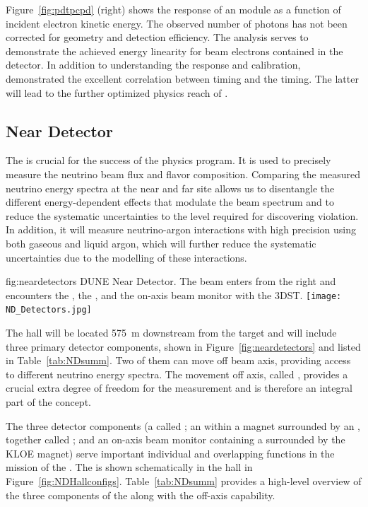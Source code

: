 Figure~\ref{fig:pdtpcpd} (right) shows the response of an %
  module as a function of incident electron kinetic energy.
The observed number of photons has not been corrected for geometry and detection efficiency. The analysis serves to demonstrate the achieved energy linearity for beam electrons contained in the detector.  
In addition to understanding the  response and calibration,  demonstrated the excellent correlation between  timing and the  timing. The latter will lead to the further optimized physics reach of . 


\subsection{Near Detector}
\label{sec:nd-verview}

The   is crucial for the success of the  physics program. It is used to precisely measure the neutrino beam flux and flavor composition. Comparing the measured neutrino energy spectra at the near and far site allows us to disentangle the different energy-dependent effects that modulate the beam spectrum and to reduce the systematic uncertainties to the level required for discovering  violation. In addition, it will measure neutrino-argon interactions with high precision using both gaseous and liquid argon, which will further reduce the systematic uncertainties due to the modelling of these interactions.

\begin{dunefigure}
{fig:neardetectors}
{DUNE Near Detector. The beam enters from the right and encounters
the , the , and the on-axis beam monitor with the 3DST.}
\texttt{[image: ND\_Detectors.jpg]}
\end{dunefigure}


The  hall will be located \SI{575}{m} downstream from the target and will include three primary detector components, shown in Figure~\ref{fig:neardetectors}  and listed in Table~\ref{tab:NDsumm}. Two of them can move off beam axis, providing access to different neutrino energy spectra. The movement off axis, called , provides a crucial extra degree of freedom for the  measurement and is therefore an integral part of the   concept. 

The three detector components (a  called ; an  within a magnet surrounded by an , together called ; and an on-axis beam monitor containing a  surrounded by the KLOE magnet) serve important individual and overlapping functions in the mission of the . 
The   is shown schematically in the   hall in Figure~\ref{fig:NDHallconfigs}.  
Table~\ref{tab:NDsumm} provides a high-level overview of the three components of the   along with the off-axis capability.  

